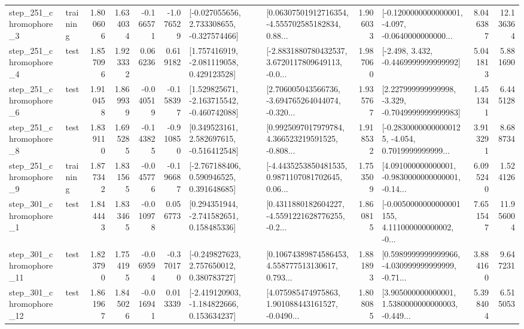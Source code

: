 \begin{tabular}{llrrrrllrlrr}
   step\_251\_chromophore\_3 &  training &      1.800606 &    1.634034 &     -0.166571 & -1.076529 &   [-0.027055656, 2.733308655, -0.327574466] &  [0.06307501912716354, -4.555702585182834, 0.88... &       1.906033 &  [-0.1200000000000001, -4.097, -0.0640000000000... &            8.046387 &         12.136364 \\
   step\_251\_chromophore\_4 &      test &      1.857096 &    1.923332 &      0.066236 &  0.619182 &    [1.757416919, -2.081119058, 0.429123528] &  [-2.8831880780432537, 3.6720117809649113, -0.0... &       1.987060 &               [-2.498, 3.432, -0.4469999999999992] &            5.041813 &          5.881690 \\
   step\_251\_chromophore\_6 &      test &      1.910458 &    1.869939 &     -0.040519 & -0.158397 &   [1.529825671, -2.163715542, -0.460742088] &  [2.706005043566736, -3.694765264044074, -0.320... &       1.935767 &   [2.227999999999998, -3.329, -0.7049999999999983] &            1.451341 &          6.445128 \\
   step\_251\_chromophore\_8 &      test &      1.839110 &    1.695285 &     -0.143825 & -0.910850 &    [0.349523161, 2.582697615, -0.516412548] &  [0.9925097017979784, 4.366523219591525, -0.808... &       1.918532 &  [-0.28300000000000125, -4.054, 0.7019999999999... &            3.913291 &          8.688734 \\
   step\_251\_chromophore\_9 &  training &      1.877342 &    1.831565 &     -0.045776 & -0.196687 &    [-2.767188406, 0.590946525, 0.391648685] &  [-4.4435253850481535, 0.9871107081702645, 0.06... &       1.753509 &  [4.091000000000001, -0.9830000000000001, -0.14... &            6.095240 &          1.524126 \\
   step\_301\_chromophore\_1 &      test &      1.844443 &    1.833465 &     -0.010978 &  0.056773 &    [0.294351944, -2.741582651, 0.158485336] &  [0.4311880182604227, -4.5591221628776255, -0.2... &       1.860815 &  [-0.0050000000000001155, 4.111000000000002, -0... &            7.651547 &         11.956004 \\
  step\_301\_chromophore\_11 &      test &      1.823790 &    1.754195 &     -0.069594 & -0.370170 &    [-0.249827623, 2.757650012, 0.380783727] &  [0.10674389874586453, 4.558777513130617, 0.793... &       1.881893 &  [0.5989999999999966, -4.030999999999999, -0.71... &            3.884160 &          9.647231 \\
  step\_301\_chromophore\_12 &      test &      1.861967 &    1.845026 &     -0.016941 &  0.013339 &   [-2.419120903, -1.184822666, 0.153634237] &  [4.075985474975863, 1.901088443161527, -0.0490... &       1.808085 &  [3.905000000000001, 1.5380000000000003, -0.449... &            5.398404 &          6.515053 \\

\end{tabular}
